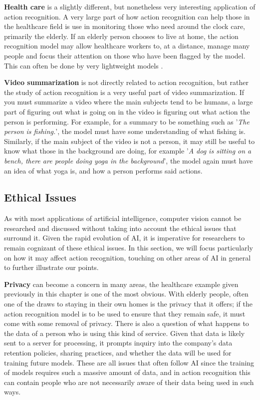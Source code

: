 \textbf{Health care} is a slightly different, but nonetheless very interesting application of action recognition. A very large part of how action recognition can help those in the healthcare field is use in monitoring those who need around the clock care, primarily the elderly. If an elderly person chooses to live at home, the action recognition model may allow healthcare workers to, at a distance, manage many people and focus their attention on those who have been flagged by the model. This can often be done by very lightweight models \cite{Eldermonitoring}.

\textbf{Video summarization} is not directly related to action recognition, but rather the study of action recognition is a very useful part of video summarization. If you must summarize a video where the main subjects tend to be humans, a large part of figuring out what is going on in the video is figuring out what action the person is performing. For example, for a summary to be something such as '\textit{The person is fishing.}', the model must have some understanding of what fishing is. Similarly, if the main subject of the video is not a person, it may still be useful to know what those in the background are doing, for example '\textit{A dog is sitting on a bench, there are people doing yoga in the background}', the model again must have an idea of what yoga is, and how a person performs said actions.

\subsection{Ethical Issues}

As with most applications of artificial intelligence, computer vision cannot be researched and discussed without taking into account the ethical issues that surround it. Given the rapid evolution of AI, it is imperative for researchers to remain cognizant of these ethical issues. In this section, we will focus particularly on how it may affect action recognition, touching on other areas of AI in general to further illustrate our points.

\textbf{Privacy} can become a concern in many areas, the healthcare example given previously in this chapter is one of the most obvious. With elderly people, often one of the draws to staying in their own homes is the privacy that it offers; if the action recognition model is to be used to ensure that they remain safe, it must come with some removal of privacy. There is also a question of what happens to the data of a person who is using this kind of service. Given that data is likely sent to a server for processing, it prompts inquiry into the company's data retention policies, sharing practices, and whether the data will be used for training future models. These are all issues that often follow AI since the training of models requires such a massive amount of data, and in action recognition this can contain people who are not necessarily aware of their data being used in such ways.

